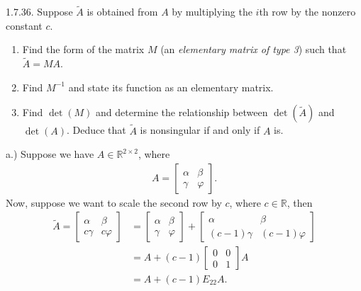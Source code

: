 \documentclass{report}
\begin{document}
    \bigbreak \noindent 
    \begin{mdframed}
        1.7.36. Suppose $\tilde{A}$ is obtained from $A$ by multiplying the $i$th row by the nonzero constant $c$.
        \begin{enumerate}[label=(\alph*)]
            \item Find the form of the matrix $M$ (an \textit{elementary matrix of type 3}) 
                such that $\tilde{A} = M A$.

            \item Find $M^{-1}$ and state its function as an elementary matrix.

            \item Find $\det(M)$ and determine the relationship between $\det(\tilde{A})$ 
                and $\det(A)$. Deduce that $\tilde{A}$ is nonsingular if and only if $A$ is.
        \end{enumerate}
    \end{mdframed}
    \bigbreak \noindent 
    a.) 
    Suppose we have $A \in \mathbb{R}^{2\times 2}$, where 
    \begin{align*}
        A = \begin{bmatrix}
            \alpha & \beta \\
            \gamma & \varphi
        \end{bmatrix}
    .\end{align*}
    Now, suppose we want to scale the second row by $c$, where $c \in \mathbb{R}$, then
    \begin{align*}
        \tilde{A} = \begin{bmatrix}
            \alpha & \beta \\ 
            c\gamma & c\varphi
        \end{bmatrix}
        &= 
        \begin{bmatrix}
            \alpha & \beta \\
            \gamma & \varphi 
        \end{bmatrix}
         + 
         \begin{bmatrix}
             \alpha & \beta \\
             (c-1)\gamma & (c-1)\varphi
         \end{bmatrix}
         \\
        &= A + (c-1)\begin{bmatrix}
            0 & 0 \\
            0 & 1
        \end{bmatrix}
        A
        \\
        &= A + (c-1)E_{22}A
    .\end{align*}
\end{document}

